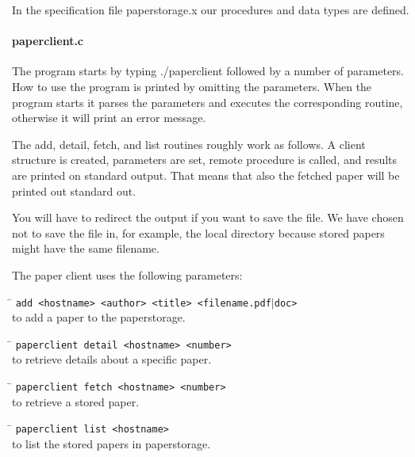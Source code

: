 \documentclass[a4paper,10pt]{article}
\begin{document}
In the specification file paperstorage.x our procedures and data types are defined.

\paragraph{paperclient.c}
The program starts by typing ./paperclient followed by a number of parameters. How to use the program is printed by omitting the parameters. When the program starts it parses the parameters and executes the corresponding routine, otherwise it will print an error message.

The add, detail, fetch, and list routines roughly work as follows. A client structure is created, parameters are set, remote procedure is called, and results are printed on standard output. That means that also the fetched paper will be printed out standard out.

You will have to redirect the output if you want to save the file. We have chosen not to save the file in, for example, the local directory because stored papers might have the same filename.

The paper client uses the following parameters:

\begin{tabbing}
\hspace{20pt}\=\kill
 \> \texttt{add <hostname> <author> <title> <filename.}{\texttt{pdf$\vert$doc}}\texttt{>} \\
 \> to add a paper to the paperstorage.
\end{tabbing}

\begin{tabbing}
\hspace{20pt}\=\kill
 \> \texttt{paperclient detail <hostname> <number>} \\
 \> to retrieve details about a specific paper.
\end{tabbing}

\begin{tabbing}
\hspace{20pt}\=\kill
 \> \texttt{paperclient fetch <hostname> <number>} \\
 \> to retrieve a stored paper.
\end{tabbing}

\begin{tabbing}
\hspace{20pt}\=\kill
 \> \texttt{paperclient list <hostname>} \\
 \> to list the stored papers in paperstorage.
\end{tabbing}
\end{document}
